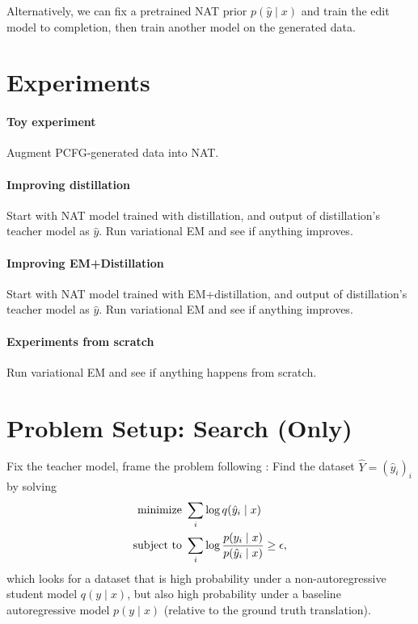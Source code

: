 \documentclass[11pt]{article}
\begin{document}
Alternatively, we can fix a pretrained NAT prior $p(\hat{y}\mid x)$ and
train the edit model to completion, then train another model on the generated data.

\section{Experiments}
\paragraph{Toy experiment}
Augment PCFG-generated data into NAT.

\paragraph{Improving distillation}
Start with NAT model trained with distillation,
and output of distillation's teacher model as $\hat{y}$.
Run variational EM and see if anything improves.

\paragraph{Improving EM+Distillation}
Start with NAT model trained with EM+distillation,
and output of distillation's teacher model as $\hat{y}$.
Run variational EM and see if anything improves.

\paragraph{Experiments from scratch}
Run variational EM and see if anything happens from scratch.

\section{Problem Setup: Search (Only)}
Fix the teacher model, frame the problem following \citet{emnat}:
Find the dataset $\hat{Y} = (\hat{y}_i)_i$ by solving
\begin{equation}
    \begin{aligned}
    \textnormal{minimize }& \sum_i \log q(\hat{y}_i \mid x)\\
    \textnormal{subject to } & \sum_i \log\frac{p(y_i \mid x)}{p(\hat{y}_i \mid x)} \ge \epsilon,
    \end{aligned}
\end{equation}
which looks for a dataset that is high probability under a non-autoregressive student model
$q(y \mid x)$, but also high probability under a baseline autoregressive model $p(y \mid x)$
(relative to the ground truth translation).
\end{document}
